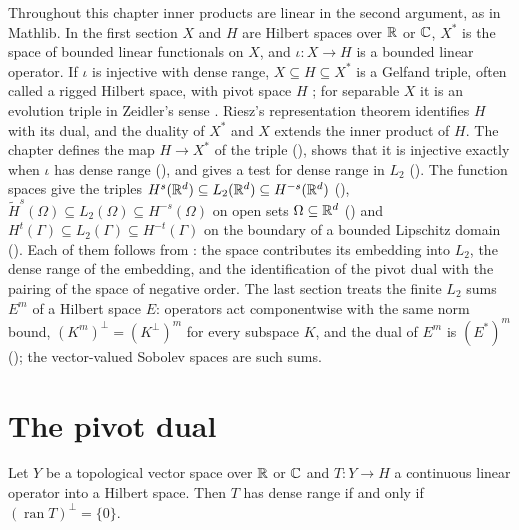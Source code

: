 Throughout this chapter inner products are linear in the second argument, as in Mathlib. In the
first section $X$ and $H$ are Hilbert spaces over $\mathbb{R}$ or $\mathbb{C}$, $X^*$ is the space of
bounded linear functionals on $X$, and $\iota : X \to H$ is a bounded linear operator. If $\iota$
is injective with dense range, $X \subseteq H \subseteq X^*$ is a Gelfand triple, often called a
rigged Hilbert space, with pivot space $H$ \cite{Brezis2011}; for separable $X$ it is an
evolution triple in Zeidler's sense \cite{ZeidlerIIA}. Riesz's representation theorem identifies
$H$ with its dual, and the duality of $X^*$ and $X$ extends the inner product of $H$. The chapter
defines the map $H \to X^*$ of the triple (), shows that it is injective
exactly when $\iota$ has dense range (), and gives a test for dense range
in $L_2$ (). The function spaces give the triples
$H^s(\mathbb{R}^d) \subseteq L_2(\mathbb{R}^d) \subseteq H^{-s}(\mathbb{R}^d)$ (),
$\tilde H^s(\Omega) \subseteq L_2(\Omega) \subseteq H^{-s}(\Omega)$ on open sets
$\Omega \subseteq \mathbb{R}^d$ () and
$H^t(\Gamma) \subseteq L_2(\Gamma) \subseteq H^{-t}(\Gamma)$ on the boundary of a bounded
Lipschitz domain (). Each of them follows from
: the space contributes its embedding into $L_2$, the dense range of the
embedding, and the identification of the pivot dual with the pairing of the space of negative
order. The last section treats the finite $L_2$ sums $E^m$ of a Hilbert space $E$: operators act
componentwise with the same norm bound,
$(K^m)^\perp = (K^\perp)^m$ for every subspace $K$, and the dual of $E^m$ is $(E^*)^m$
(); the vector-valued Sobolev spaces are such sums.

\section{The pivot dual}
\label{sec:gelfand-triples}

\begin{lemma}
\label{lem:dense-range-orthogonal}
\leanok
Let $Y$ be a topological vector space over $\mathbb{R}$ or $\mathbb{C}$ and $T : Y \to H$ a continuous linear
operator into a Hilbert space. Then $T$ has dense range if and only if
$(\operatorname{ran} T)^\perp = \{0\}$.
\end{lemma}

